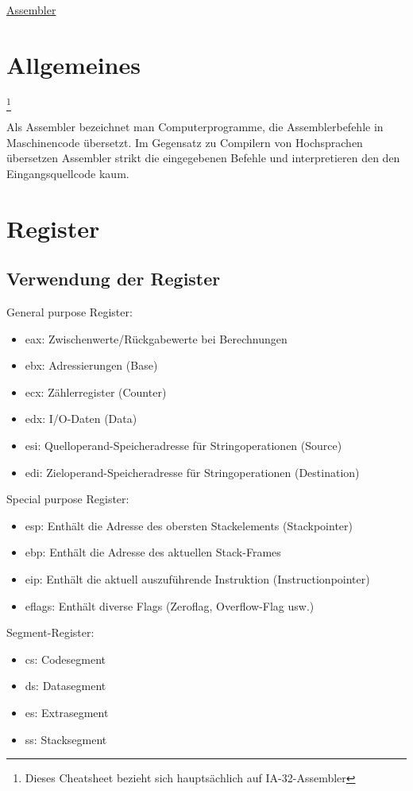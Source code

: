 \begin{center}
     \Large{\underline{Assembler}} \\
\end{center}

\section{Allgemeines}\footnote{Dieses Cheatsheet bezieht sich hauptsächlich auf IA-32-Assembler}

Als Assembler bezeichnet man Computerprogramme, die Assemblerbefehle in Maschinencode übersetzt. Im Gegensatz zu Compilern von Hochsprachen übersetzen Assembler strikt die eingegebenen Befehle und interpretieren den den Eingangsquellcode kaum.
\section{Register}
\subsection{Verwendung der Register}
General purpose Register:
\begin{itemize}
\item eax: Zwischenwerte/Rückgabewerte bei Berechnungen
\item ebx: Adressierungen (Base)
\item ecx: Zählerregister (Counter)
\item edx: I/O-Daten (Data)
\item esi: Quelloperand-Speicheradresse für Stringoperationen (Source)
\item edi: Zieloperand-Speicheradresse für Stringoperationen (Destination)
\end{itemize}
Special purpose Register:
\begin{itemize}
\item esp: Enthält die Adresse des obersten Stackelements (Stackpointer)
\item ebp: Enthält die Adresse des aktuellen Stack-Frames
\item eip: Enthält die aktuell auszuführende Instruktion (Instructionpointer)
\item eflags: Enthält diverse Flags (Zeroflag, Overflow-Flag usw.)
\end{itemize}
Segment-Register:
\begin{itemize}
\item cs: Codesegment
\item ds: Datasegment
\item es: Extrasegment
\item ss: Stacksegment
\end{itemize}
